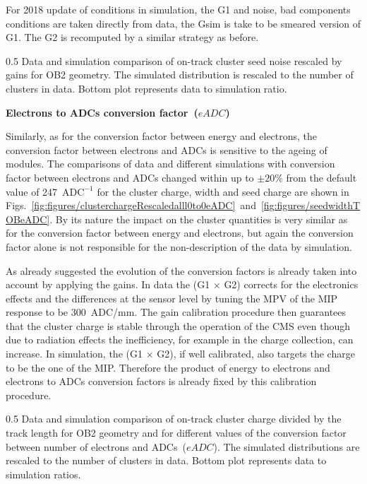 For 2018  update of conditions in simulation, the G1 and noise, bad components conditions are taken directly from data, the Gsim is take to be smeared version of G1. The G2 is recomputed by a similar strategy as before.

                 {0.5}       %
                 { Data and simulation comparison of on-track cluster seed noise rescaled by gains for OB2 geometry. The simulated distribution is rescaled to the number of clusters in data.  Bottom plot represents data to simulation ratio. }


\textbf{Electrons to ADCs conversion factor~($eADC$)}

Similarly, as for the conversion factor between energy and electrons, the conversion factor between electrons and ADCs is sensitive to the ageing of modules. The comparisons of data and different simulations with conversion factor between electrons and ADCs changed within up to $\pm 20\%$ from the default value of 247~$\mathrm{ADC^{-1}}$ for the cluster charge, width and seed charge are shown in Figs.~\ref{fig:figures/clusterchargeRescaledalll0to0eADC}~and~\ref{fig:figures/seedwidthTOBeADC}. By its nature the impact on the cluster quantities is very similar as for the conversion factor between energy and electrons, but again the conversion factor alone is not responsible for the non-description of the data by simulation. 

As already suggested the evolution of the conversion factors is already taken into account by applying the gains. In data the (G1 $\times$ G2) corrects for the electronics effects and the differences at the sensor level by tuning the MPV of the MIP response to be 300~ADC/mm. The gain calibration procedure then guarantees that the cluster charge is stable through the operation of the CMS even though due to radiation effects the inefficiency, for example in the charge collection, can increase. In simulation, the (G1 $\times$ G2), if well calibrated, also targets the charge to be the one of the MIP. Therefore the product of energy to electrons and electrons to ADCs conversion factors is already fixed by this calibration procedure. 


                 {0.5}       %
                 { Data and simulation comparison of on-track cluster charge divided by the track length for OB2 geometry and for different values of the conversion factor between number of electrons and ADCs~($eADC$). The simulated distributions are rescaled to the number of clusters in data.  Bottom plot represents data to simulation ratios. }

